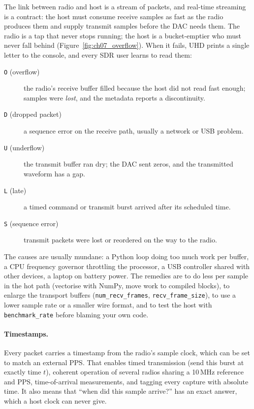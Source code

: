 The link between radio and host is a stream of packets, and real-time streaming is a contract: the host
must consume receive samples as fast as the radio produces them and supply transmit samples before the
DAC needs them. The radio is a tap that never stops running; the host is a bucket-emptier who must
never fall behind (Figure~\ref{fig:ch07_overflow}). When it fails, UHD prints a single letter to the
console, and every SDR user learns to read them:
\begin{description}
\item[\texttt{O} (overflow)] the radio's receive buffer filled because the host did not read fast enough;
samples were \emph{lost}, and the metadata reports a discontinuity.
\item[\texttt{D} (dropped packet)] a sequence error on the receive path, usually a network or USB problem.
\item[\texttt{U} (underflow)] the transmit buffer ran dry; the DAC sent zeros, and the transmitted
waveform has a gap.
\item[\texttt{L} (late)] a timed command or transmit burst arrived after its scheduled time.
\item[\texttt{S} (sequence error)] transmit packets were lost or reordered on the way to the radio.
\end{description}


The causes are usually mundane: a Python loop doing too much work per buffer, a CPU frequency governor
throttling the processor, a USB controller shared with other devices, a laptop on battery power. The
remedies are to do less per sample in the hot path (vectorise with NumPy, move work to compiled blocks),
to enlarge the transport buffers (\texttt{num\_recv\_frames}, \texttt{recv\_frame\_size}), to use a lower
sample rate or a smaller wire format, and to test the host with \texttt{benchmark\_rate} before blaming
your own code.

\paragraph{Timestamps.} Every packet carries a timestamp from the radio's sample clock, which can be set
to match an external PPS. That enables timed transmission (send this burst at exactly time $t$), coherent
operation of several radios sharing a 10\,MHz reference and PPS, time-of-arrival measurements, and
tagging every capture with absolute time. It also means that ``when did this sample arrive?'' has an exact
answer, which a host clock can never give.

